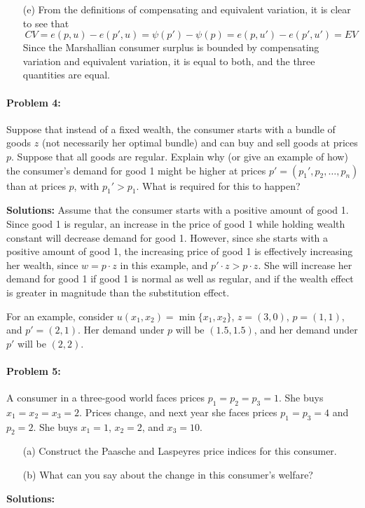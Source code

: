 \documentclass[12pt]{article}
\begin{document}
\begin{itemize}
    \item[(e)] From the definitions of compensating and equivalent variation, it is clear to see that
    \[
    CV = e(p,u) - e(p',u) = \psi(p') - \psi(p) = e(p,u') - e(p',u') = EV
    \]
    Since the Marshallian consumer surplus is bounded by compensating variation and equivalent variation, it is equal to both, and the three quantities are equal.

    
\end{itemize}

\paragraph{Problem 4:} Suppose that instead of a fixed wealth, the consumer starts with a bundle of goods $z$ (not necessarily her optimal bundle) and can buy and sell goods at prices $p$. Suppose that all goods are regular. Explain why (or give an example of how) the consumer's demand for good 1 might be higher at prices $p' = (p_1',p_2,\dots,p_n)$ than at prices $p$, with $p_1' > p_1$. What is required for this to happen?

\textbf{Solutions:} Assume that the consumer starts with a positive amount of good 1. Since good 1 is regular, an increase in the price of good 1 while holding wealth constant will decrease demand for good 1. However, since she starts with a positive amount of good 1, the increasing price of good 1 is effectively increasing her wealth, since $w = p\cdot z$ in this example, and $p' \cdot z > p \cdot z$. She will increase her demand for good 1 if good 1 is normal as well as regular, and if the wealth effect is greater in magnitude than the substitution effect. 

\medskip

For an example, consider $u(x_1,x_2) = \min\{x_1,x_2\}$, $z = (3,0)$, $p = (1,1)$, and $p' = (2,1)$. Her demand under $p$ will be $(1.5,1.5)$, and her demand under $p'$ will be $(2,2)$.


\paragraph{Problem 5:} A consumer in a three-good world faces prices $p_1 = p_2 = p_3 = 1$. She buys $x_1 = x_2 = x_3 = 2$. Prices change, and next year she faces prices $p_1 = p_3 = 4$ and $p_2 = 2$. She buys $x_1 = 1$, $x_2 = 2$, and $x_3 = 10$.

\begin{itemize}
    \item[(a)] Construct the Paasche and Laspeyres price indices for this consumer.

    \item[(b)] What can you say about the change in this consumer's welfare?
\end{itemize}
\medskip
\textbf{Solutions:}
\end{document}
